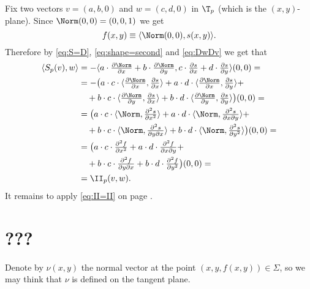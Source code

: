 Fix two vectors $v=(a,b,0)$ and $w=(c,d,0)$ in $\T_p$ (which is the $(x,y)$-plane).
Since $\Norm(0,0)=(0,0,1)$ we get 
\[f(x,y)\equiv\langle\Norm(0,0),s(x,y)\rangle.\]
Therefore by \ref{eq:S=D}, \ref{eq:shape=second} and \ref{eq:DwDv} we get that 
\begin{align*}
\langle S_p(v),w\rangle 
&=-\langle  a\cdot \tfrac{\partial \Norm}{\partial x}+b\cdot \tfrac{\partial \Norm}{\partial y},c\cdot \tfrac{\partial s}{\partial x}+d\cdot \tfrac{\partial s}{\partial y}\rangle(0,0)=
\\
&=-\bigl(a\cdot c\cdot\langle \tfrac{\partial \Norm}{\partial x},\tfrac{\partial s}{\partial x}\rangle 
+a\cdot d\cdot\langle \tfrac{\partial \Norm}{\partial x},\tfrac{\partial s}{\partial y}\rangle+
\\&\quad
+b\cdot c\cdot\langle \tfrac{\partial \Norm}{\partial y},\tfrac{\partial s}{\partial x}\rangle
+b\cdot d\cdot\langle \tfrac{\partial \Norm}{\partial y},\tfrac{\partial s}{\partial y}\rangle\bigr)(0,0)=
\\
&=\bigl(a\cdot c\cdot\langle \Norm,\tfrac{\partial^2 s}{\partial x^2}\rangle 
+a\cdot d\cdot\langle \Norm,\tfrac{\partial^2 s}{\partial x\partial y}\rangle+
\\&\quad
+b\cdot c\cdot\langle \Norm,\tfrac{\partial^2 s}{\partial y\partial x}\rangle
+b\cdot d\cdot\langle \Norm,\tfrac{\partial^2 s}{\partial y^2}\rangle\bigr)(0,0)=
\\
&=\bigl(a\cdot c\cdot\tfrac{\partial^2 f}{\partial x^2} 
+a\cdot d\cdot\tfrac{\partial^2 f}{\partial x\partial y}+
\\&\quad
+b\cdot c\cdot\tfrac{\partial^2 f}{\partial y\partial x}
+b\cdot d\cdot\tfrac{\partial^2 f}{\partial y^2}\bigr)(0,0)=
\\
&=\II_p(v,w).
\end{align*}
It remains to apply \ref{eq:II=II} on page \pageref{eq:II=II}.
\qeds
















\section*{???}

Denote by $\nu(x,y)$ the normal vector at the point $(x,y,f(x,y))\in \Sigma$, so we may think that $\nu$ is defined on the tangent plane.

